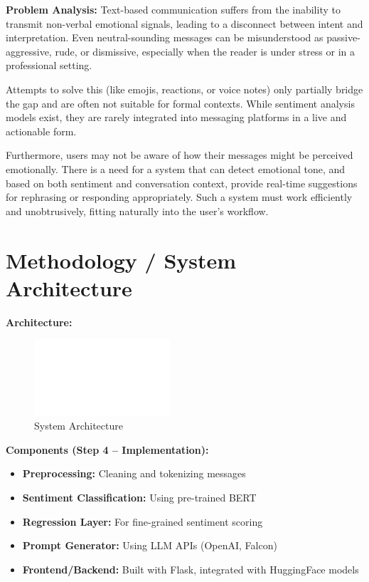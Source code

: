 \documentclass{ecai}
\begin{document}
\textbf{Problem Analysis: } Text-based communication suffers from the inability to transmit non-verbal emotional signals, leading to a disconnect between intent and interpretation. Even neutral-sounding messages can be misunderstood as passive-aggressive, rude, or dismissive, especially when the reader is under stress or in a professional setting.

Attempts to solve this (like emojis, reactions, or voice notes) only partially bridge the gap and are often not suitable for formal contexts. While sentiment analysis models exist, they are rarely integrated into messaging platforms in a live and actionable form.

Furthermore, users may not be aware of how their messages might be perceived emotionally. There is a need for a system that can detect emotional tone, and based on both sentiment and conversation context, provide real-time suggestions for rephrasing or responding appropriately. Such a system must work efficiently and unobtrusively, fitting naturally into the user's workflow.

\section{Methodology / System Architecture}
\textbf{Architecture:}
\begin{figure}[h]
  \centering
  \includegraphics[width=0.45\textwidth]{architecture.png}
  \caption{System Architecture}
\end{figure}

\textbf{Components (Step 4 – Implementation):}
\begin{itemize}
  \item \textbf{Preprocessing:} Cleaning and tokenizing messages
  \item \textbf{Sentiment Classification:} Using pre-trained BERT
  \item \textbf{Regression Layer:} For fine-grained sentiment scoring
  \item \textbf{Prompt Generator:} Using LLM APIs (OpenAI, Falcon)
  \item \textbf{Frontend/Backend:} Built with Flask, integrated with HuggingFace models
\end{itemize}
\end{document}
